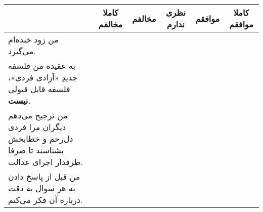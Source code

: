 \documentclass[a4paper,10pt]{article}
\begin{document}
\begin{center}
\begin{tabular}{|p{6cm}|c|c|c|c|c|}
\hline
 & کاملا مخالفم & مخالفم & نظری ندارم & موافقم & کاملا موافقم\\
\hline



من زود خنده‌ام می‌گیرد.& & & & & \\
\hline


به عقیده من فلسفه جدیدِ «آزادی فردی»، فلسفه قابل قبولی \textbf{نیست.}& & & & & \\
\hline


من ترجیح می‌دهم دیگران مرا فردی دل‌رحم و خطابخش بشناسند تا صرفا طرفدار اجرای عدالت.& & & & & \\
\hline


من قبل از پاسخ دادن به هر سوال به دقت درباره آن فکر می‌کنم.& & & & & \\
\hline




\end{tabular}
\end{center}
\end{document}
